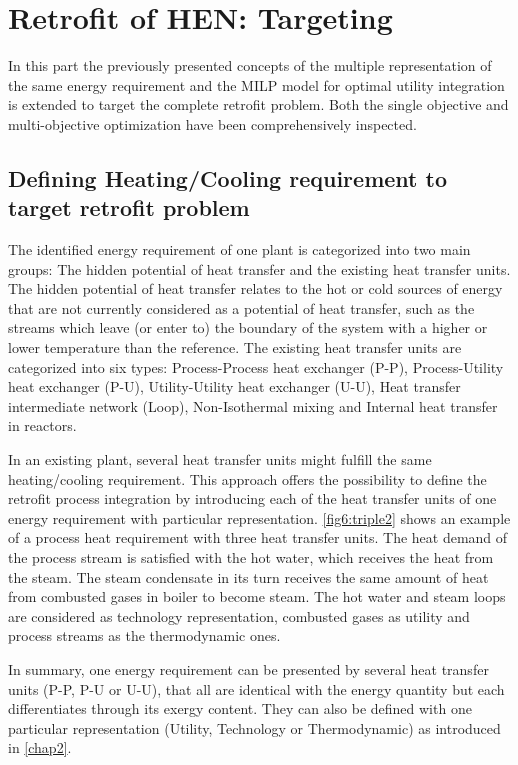 \section{Retrofit of HEN: Targeting}
In this part the previously presented concepts of the multiple representation of the same energy requirement and the MILP model for optimal utility integration is extended to target the complete retrofit problem. Both the single objective and multi-objective optimization have been comprehensively inspected.


\subsection{Defining Heating/Cooling requirement to target retrofit problem}
\label{subsec6:heattransinterface}

The identified energy requirement of one plant is categorized into two main groups: The hidden potential of heat transfer and the existing heat transfer units. The hidden potential of heat transfer relates to the hot or cold sources of energy that are not currently considered as a potential of heat transfer, such as the streams which leave (or enter to) the boundary of the system with a higher or lower temperature than the reference. The existing heat transfer units are categorized into six types: Process-Process heat exchanger (P-P), Process-Utility heat exchanger (P-U), Utility-Utility heat exchanger (U-U), Heat transfer intermediate network (Loop), Non-Isothermal mixing and Internal heat transfer in reactors. 

In an existing plant, several heat transfer units might fulfill the same heating/cooling requirement. This approach offers the possibility to define the retrofit process integration by introducing each of the heat transfer units of one energy requirement with particular representation. \cref{fig6:triple2} shows an example of a process heat requirement with three heat transfer units. The heat demand of the process stream is satisfied with the hot water, which receives the heat from the steam. The steam condensate in its turn receives the same amount of heat from combusted gases in boiler to become steam. The hot water and steam loops are considered as technology representation, combusted gases as utility and process streams as the thermodynamic ones. 

In summary, one energy requirement can be presented by several heat transfer units (P-P, P-U or U-U), that all are identical with the energy quantity but each differentiates through its exergy content. They can also be defined with one particular representation (Utility, Technology or Thermodynamic) as introduced in \cref{chap2}.

